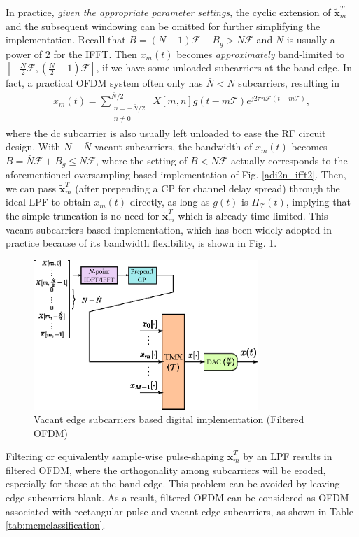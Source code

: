 \documentclass[journal]{IEEEtran}
\begin{document}
In practice, \emph{given the appropriate parameter settings}, the cyclic extension of $\tilde {\mathbf x}_m^T$ and the subsequent windowing can be omitted for further simplifying the implementation. Recall that $B=(N-1)\mathcal F+B_g>N\mathcal F$ and $N$ is usually a power of $2$ for the IFFT. Then $x_m(t)$ becomes \emph{approximately} band-limited to $[-\frac{N}{2}\mathcal F, (\frac{N}{2}-1)\mathcal F]$, if we have some unloaded  subcarriers at the band edge. In fact, a practical OFDM system often only has $\bar N < N$ subcarriers, resulting in
\begin{align}\label{txt_bl}
  x_m(t)= \sum_{\substack{n=-\bar N/2, \\ n \ne 0}}^{\bar N/2}X[m,n]g(t-m\mathcal T)e^{j2\pi n \mathcal F(t-m\mathcal T)},
\end{align}
where the \ac{dc} subcarrier is also usually left unloaded to ease the RF circuit design\cite{rfme}. With $N-\bar N$ vacant subcarriers, the bandwidth of $x_m(t)$ becomes $B=\bar N\mathcal F+B_g \le  N\mathcal F$, where the setting of $B<N\mathcal F$ actually corresponds to the aforementioned oversampling-based implementation of Fig. \ref{adi2n_ifft2}. Then, we can pass $\tilde {\mathbf x}_m^T$ (after prepending a CP for channel delay spread) through the ideal LPF to obtain $x_m(t)$ directly, as long as $g(t)$ is $\Pi_{\mathcal T}(t)$, implying that the simple truncation is no need for $\tilde {\mathbf x}_m^T$ which is already time-limited. This vacant subcarriers based implementation, {which has been widely adopted in practice because of its bandwidth flexibility}, is shown in Fig. \ref{adi2n_ifft3}.

\begin{figure}[t]
  \centering
  \includegraphics[width=8.5cm]{adi2n_ifft3}
  \caption{Vacant edge subcarriers based digital implementation (Filtered OFDM)}
  \label{adi2n_ifft3}
\end{figure}

Filtering or equivalently sample-wise pulse-shaping $\tilde {\mathbf x}_m^T$ by an LPF results in filtered OFDM\cite{fofdm,fofdmspawc}, where the orthogonality among subcarriers will be eroded, especially for those at the band edge. This problem can be avoided by leaving edge subcarriers blank\cite{fofdm}. As a result, filtered OFDM can be considered as OFDM associated with rectangular pulse and vacant edge subcarriers, as shown in Table \ref{tab:mcmclassification}. 
\end{document}
